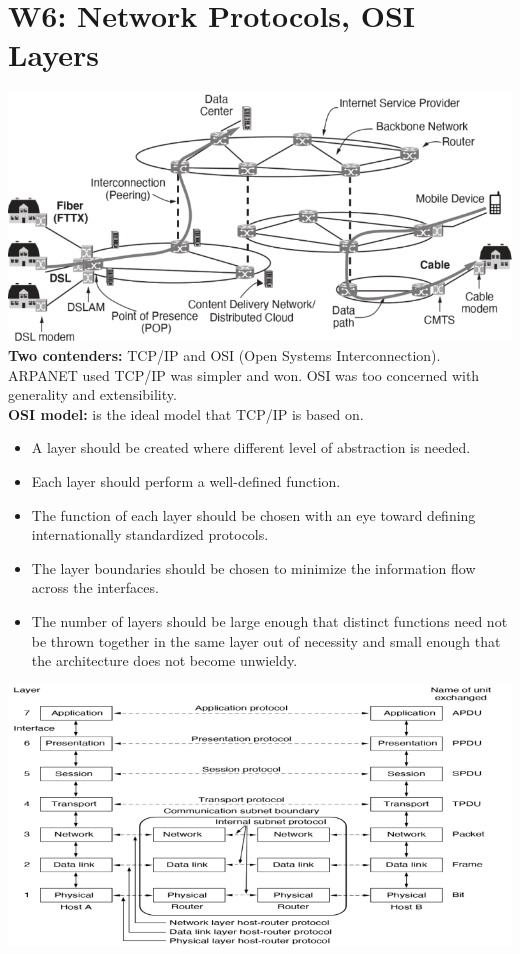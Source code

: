 \section{W6: Network Protocols, OSI Layers}
\includegraphics[width=\linewidth]{figs/internet-diagram.png}
\textbf{Two contenders:} TCP/IP and OSI (Open Systems Interconnection). ARPANET used TCP/IP was simpler and won. OSI was too concerned with generality and extensibility.\\
\textbf{OSI model:} is the ideal model that TCP/IP is based on.
\begin{itemize}
    \item A layer should be created where different level of abstraction is needed.
    \item Each layer should perform a well-defined function.
    \item The function of each layer should be chosen with an eye toward defining internationally standardized protocols.
    \item The layer boundaries should be chosen to minimize the information flow across the interfaces.
    \item The number of layers should be large enough that distinct functions need not be thrown together in the same layer out of necessity and small enough that the architecture does not become unwieldy.
\end{itemize}
\includegraphics[width=\linewidth]{figs/osi-model.png}
